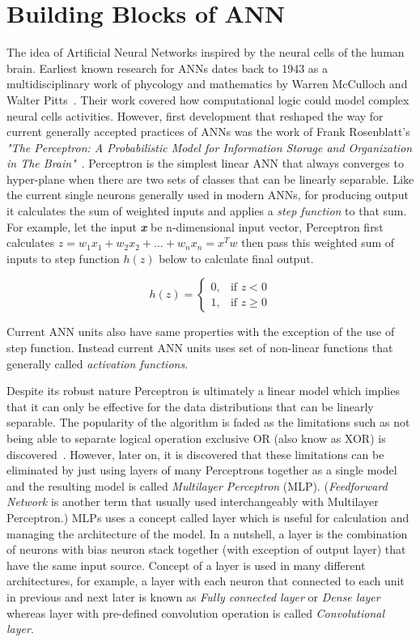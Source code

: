 \section{Building Blocks of ANN} \label{sec:bbann}
The idea of Artificial Neural Networks inspired by the neural cells of the human brain. Earliest known research for ANNs dates back to 1943 as a multidisciplinary work of phycology and mathematics by Warren McCulloch and Walter Pitts~\cite{firstann}. Their work covered how computational logic could model complex neural cells activities. However, first development that reshaped the way for current generally accepted practices of ANNs was the work of Frank Rosenblatt's  \emph{"The Perceptron: A Probabilistic Model for Information Storage and Organization in The Brain"}~\cite{perceptron}. Perceptron is the simplest linear ANN that always converges to hyper-plane when there are two sets of classes that can be linearly separable. Like the current single neurons generally used in modern ANNs, for producing output it calculates the sum of weighted inputs and applies a \emph{step function} to that sum. For example, let the input \textbf{\textit{x}} be n-dimensional input vector, Perceptron first calculates \(z = w_1x_1 + w_2x_2 + \ldots + w_nx_n = x^Tw\) then pass this weighted sum of inputs to step function \(h(z)\) below to calculate final output. 

\begin{equation} \label{eq:stepfunc21}
h(z)=
\begin{cases}
    0, & \text{if } z< 0\\
    1, & \text{if } z\geq 0
\end{cases}    
\end{equation}

Current ANN units also have same properties with the exception of the use of step function. Instead current ANN units uses set of non-linear functions that generally called \emph{activation functions}. 

Despite its robust nature Perceptron is ultimately a linear model which implies that it can only be effective for the data distributions that can be linearly separable.
The popularity of the algorithm is faded as the limitations such as not being able to separate logical operation exclusive OR (also know as XOR) is discovered~\cite{marvinperceptrons}.
However, later on, it is discovered that these limitations can be eliminated by just using layers of many Perceptrons together as a single model and the resulting model is called \emph{Multilayer Perceptron} (MLP). 
(\emph{Feedforward Network} is another term that usually used interchangeably with Multilayer Perceptron.)
MLPs uses a concept called layer which is useful for calculation and managing the architecture of the model.
In a nutshell, a layer is the combination of neurons with bias neuron stack together (with exception of output layer) that have the same input source.
Concept of a layer is used in many different architectures, for example, a layer with each neuron that connected to each unit in previous and next later is known as \emph{Fully connected layer} or \emph{Dense layer} whereas layer with pre-defined convolution operation is called \emph{Convolutional layer}. 

